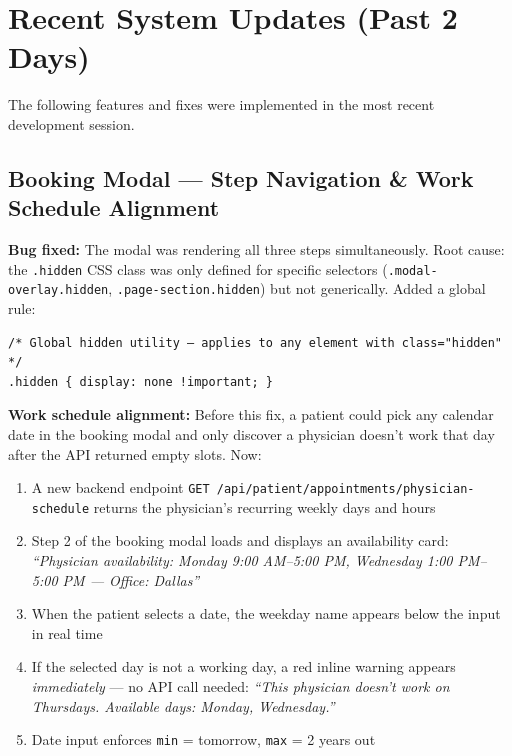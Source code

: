 \documentclass[12pt, letterpaper]{article}
\begin{document}
\section{Recent System Updates (Past 2 Days)}

The following features and fixes were implemented in the most recent development session.

\subsection{Booking Modal — Step Navigation \& Work Schedule Alignment}

\textbf{Bug fixed:} The modal was rendering all three steps simultaneously. Root cause: the \texttt{.hidden} CSS class was only defined for specific selectors (\texttt{.modal-overlay.hidden}, \texttt{.page-section.hidden}) but not generically. Added a global rule:

\begin{lstlisting}[language={},caption={CSS fix — global hidden utility}]
/* Global hidden utility — applies to any element with class="hidden" */
.hidden { display: none !important; }
\end{lstlisting}

\textbf{Work schedule alignment:} Before this fix, a patient could pick any calendar date in the booking modal and only discover a physician doesn't work that day after the API returned empty slots. Now:

\begin{enumerate}
  \item A new backend endpoint \texttt{GET /api/patient/appointments/physician-schedule} returns the physician's recurring weekly days and hours
  \item Step 2 of the booking modal loads and displays an availability card: \textit{``Physician availability: Monday 9:00 AM--5:00 PM, Wednesday 1:00 PM--5:00 PM — Office: Dallas''}
  \item When the patient selects a date, the weekday name appears below the input in real time
  \item If the selected day is not a working day, a red inline warning appears \textit{immediately} — no API call needed: \textit{``This physician doesn't work on Thursdays. Available days: Monday, Wednesday.''}
  \item Date input enforces \texttt{min} = tomorrow, \texttt{max} = 2 years out
\end{enumerate}
\end{document}
